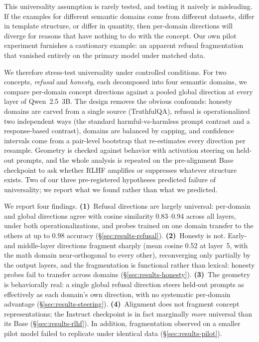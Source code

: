 \documentclass[11pt]{article}
\begin{document}
This universality assumption is rarely tested, and testing it naively is
misleading. If the examples for different semantic domains come from
different datasets, differ in template structure, or differ in quantity,
then per-domain directions will diverge for reasons that have nothing to do
with the concept. Our own pilot experiment furnishes a cautionary example:
an apparent refusal fragmentation that vanished entirely on the primary
model under matched data.

We therefore stress-test universality under controlled conditions. For two
concepts, \textit{refusal} and \textit{honesty}, each decomposed into four
semantic domains, we compare per-domain concept directions against a pooled
global direction at every layer of Qwen~2.5~3B. The design removes the
obvious confounds: honesty domains are carved from a single source
(TruthfulQA), refusal is operationalized two independent ways (the standard
harmful-vs-harmless prompt contrast and a response-based contrast), domains
are balanced by capping, and confidence intervals come from a pair-level
bootstrap that re-estimates every direction per resample. Geometry is
checked against behavior with activation steering on held-out prompts, and
the whole analysis is repeated on the pre-alignment Base checkpoint to ask
whether RLHF amplifies or suppresses whatever structure exists. Two of our
three pre-registered hypotheses predicted failure of universality; we report
what we found rather than what we predicted.

We report four findings. \textbf{(1)}~Refusal directions are largely
universal: per-domain and global directions agree with cosine similarity
0.83--0.94 across all layers, under both operationalizations, and probes
trained on one domain transfer to the others at up to 0.98 accuracy
(\S\ref{sec:results-refusal}). \textbf{(2)}~Honesty is not. Early- and
middle-layer directions fragment sharply (mean cosine 0.52 at layer~5, with
the math domain near-orthogonal to every other), reconverging only partially
by the output layers, and the fragmentation is functional rather than
lexical: honesty probes fail to transfer across domains
(\S\ref{sec:results-honesty}). \textbf{(3)}~The
geometry is behaviorally real: a single global refusal direction steers
held-out prompts as effectively as each domain's own direction, with no
systematic per-domain advantage (\S\ref{sec:results-steering}). \textbf{(4)}~Alignment does not
fragment concept representations; the Instruct checkpoint is in fact
marginally \emph{more} universal than its Base (\S\ref{sec:results-rlhf}).
In addition, fragmentation observed on a smaller pilot model failed to
replicate under identical data (\S\ref{sec:results-pilot}).
\end{document}
